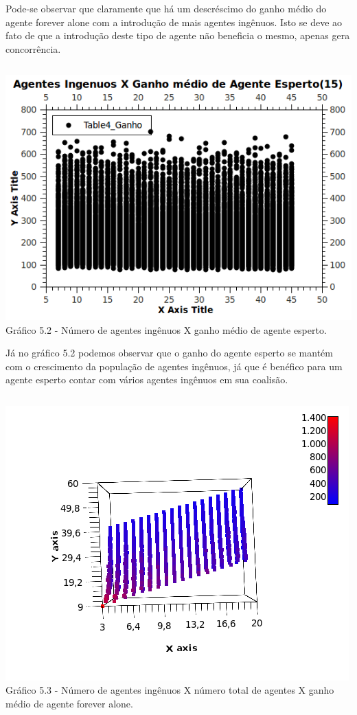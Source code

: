 \documentclass[11pt,reqno]{article}
\begin{document}
Pode-se observar que claramente que há um descréscimo do ganho médio do agente forever alone com a introdução de mais agentes ingênuos. Isto se deve ao fato de que
a introdução deste tipo de agente não beneficia o mesmo, apenas gera concorrência.

$$$$

\begin{center}
  \includegraphics[scale=0.6]{Figuras/GanhoSA15.png}\\
  \scriptsize{Gráfico 5.2 - Número de agentes ingênuos X ganho médio de agente esperto.}
\end{center}

Já no gráfico 5.2 podemos observar que o ganho do agente esperto se mantém com o crescimento da população de agentes ingênuos, já que é benéfico para um agente esperto
contar com vários agentes ingênuos em sua coalisão.

$$$$

\begin{center}
   \includegraphics[scale=0.6]{Figuras/GanhoFA10(NAxNI).png}\\
  \scriptsize{Gráfico 5.3 - Número de agentes ingênuos X número total de agentes X ganho médio de agente forever alone.}
\end{center}
\end{document}

